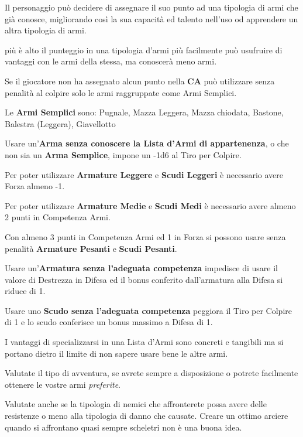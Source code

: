 \begin{multicols}{2}
Il personaggio può decidere di assegnare il suo punto ad una tipologia di armi che già conosce, migliorando così la sua capacità ed talento nell'uso od apprendere un altra tipologia di armi.

più è alto il punteggio in una tipologia d'armi più facilmente può usufruire di vantaggi con le armi della stessa, ma conoscerà meno armi.

Se il giocatore non ha assegnato alcun punto nella \textbf{CA} può utilizzare senza penalità al colpire solo le armi raggruppate come Armi Semplici.

Le \textbf{Armi Semplici} sono: Pugnale, Mazza Leggera, Mazza chiodata, Bastone, Balestra (Leggera), Giavellotto

Usare un'\textbf{Arma senza conoscere la Lista d'Armi di appartenenza}, o che non sia un \textbf{Arma Semplice}, impone un -1d6 al Tiro per Colpire.

Per poter utilizzare \textbf{Armature Leggere} e \textbf{Scudi Leggeri} è necessario avere Forza almeno -1.\label{indossarearmature}\hypertarget{indossarearmature}{}

Per poter utilizzare \textbf{Armature Medie} e \textbf{Scudi Medi} è necessario avere almeno 2 punti in Competenza Armi.

Con almeno 3 punti in Competenza Armi ed 1 in Forza si possono usare senza penalità \textbf{Armature Pesanti} e \textbf{Scudi Pesanti}.

Usare un'\textbf{Armatura senza l'adeguata competenza} impedisce di usare il valore di Destrezza in Difesa ed il bonus conferito dall'armatura alla Difesa si riduce di 1.

Usare uno \textbf{Scudo senza l'adeguata competenza} peggiora il Tiro per Colpire di 1 e lo scudo conferisce un bonus massimo a Difesa di 1.


\begin{giocatore}
I vantaggi di specializzarsi in una Lista d'Armi sono concreti e tangibili ma si portano dietro il limite di non sapere usare bene le altre armi.

Valutate il tipo di avventura, se avrete sempre a disposizione o potrete facilmente ottenere le vostre armi \emph{preferite}.

Valutate anche se la tipologia di nemici che affronterete possa avere delle resistenze o meno alla tipologia di danno che causate. Creare un ottimo arciere quando si affrontano quasi sempre scheletri non è una buona idea.
\end{giocatore}


\end{multicols}
